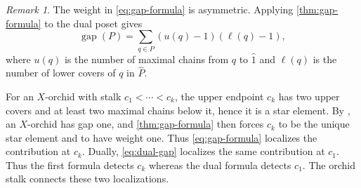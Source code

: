 \documentclass[a4paper, 11pt]{amsart}
\theoremstyle{definition}
\theoremstyle{remark}
\newtheorem{remark}[theorem]{Remark}
\newcommand{\gap}{\operatorname{gap}}
\begin{document}
\begin{remark}\label{rem:dual}
The weight in \eqref{eq:gap-formula} is asymmetric. Applying \cref{thm:gap-formula} to the dual poset gives
\begin{equation}\label{eq:dual-gap}
  \gap(P)=\sum_{q\in P}(u(q)-1)(\ell(q)-1),
\end{equation}
where $u(q)$ is the number of maximal chains from $q$ to $\widehat 1$ and $\ell(q)$ is the number of lower covers of $q$ in $\widehat P$.

For an $X$-orchid with stalk $c_1<\cdots<c_k$, the upper endpoint $c_k$ has two upper covers and at least two maximal chains below it, hence it is a star element. By \cite[Theorem~14]{BhandariEtAl2025}, an $X$-orchid has gap one, and \cref{thm:gap-formula} then forces $c_k$ to be the unique star element and to have weight one. Thus \eqref{eq:gap-formula} localizes the contribution at $c_k$. Dually, \eqref{eq:dual-gap} localizes the same contribution at $c_1$. Thus the first formula detects $c_k$ whereas the dual formula detects $c_1$. The orchid stalk connects these two localizations.
\end{remark}
\end{document}
